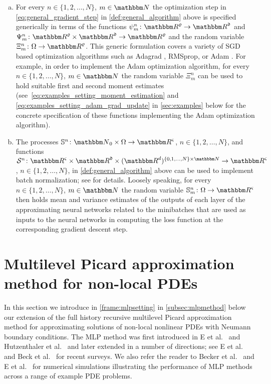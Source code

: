 \begin{enumerate}[(a)]
	\item For every $n\in\{1,2,\dots,N\}$, $m\in\N$ the optimization step in \cref{eq:general_gradient_step} in \cref{def:general_algorithm} above is specified generically in terms of the functions $\psi^n_m\colon \R^{\varrho}\to\R^{\mathfrak d}$ and $\Psi^n_m\colon\R^{\varrho}\times\R^{\mathfrak d}\to\R^{\varrho}$ and the random variable $\Xi^n_m\colon \Omega\to\R^{\varrho}$. This generic formulation covers a variety of SGD based optimization algorithms such as Adagrad \citep{duchi2011adaptive}, RMSprop, or Adam \citep{Kingma2014}. For example, in order to implement the Adam optimization algorithm, for every $n\in\{1,2,\dots,N\}$, $m\in\N$ the random variable $\Xi^n_m$ can be used to hold suitable first and second moment estimates (see~\cref{eq:examples_setting_moment_estimation} and \cref{eq:examples_setting_adam_grad_update} in \cref{sec:examples} below for the concrete specification of these functions implementing the Adam optimization algorithm).
	\item The processes $\mathbb{S}^n\colon \N_0\times\Omega \to \R^{\varsigma}$, $n\in\{1,2,\ldots,N\}$, and functions $\mathcal S^n\colon \R^{\varsigma}\times\R^{\mathfrak d}\times(\R^d)^{\{0,1,\dots,N\}\times\N}\to\R^\varsigma$, $n\in\{1,2,\dots,N\}$, in \cref{def:general_algorithm} above can be used to implement batch normalization; see \citep{ioffe2015batch} for details. Loosely speaking, for every $n\in\{1,2,\dots,N\}$, $m\in\N$ the random variable $\mathbb S^n_m\colon \Omega\to\R^\varsigma$ then holds mean and variance estimates of the outputs of each layer of the approximating neural networks related to the minibatches that are used as inputs to the neural networks in computing the loss function at the corresponding gradient descent step.
\end{enumerate}

\section{Multilevel Picard approximation method for non-local PDEs}
\label{sec:MLP}

In this section we introduce in \cref{frame:mlpsetting} in \cref{subsec:mlpmethod} below our extension of the full history recursive multilevel Picard approximation method for approximating solutions of non-local nonlinear PDEs with Neumann boundary conditions. The MLP method was first introduced in E et al.~\citep{Weinan2021} and Hutzenthaler et al.~\citep{Hutzenthaler2020} and later extended in a number of directions; see E et al.~\citep{E2020} and Beck et al.~\citep{Beck2020} for recent surveys. We also refer the reader to Becker et al.~\citep{becker2020numerical} and E et al.~\citep{E2019multilevel} for numerical simulations illustrating the performance of MLP methods across a range of example PDE problems.

